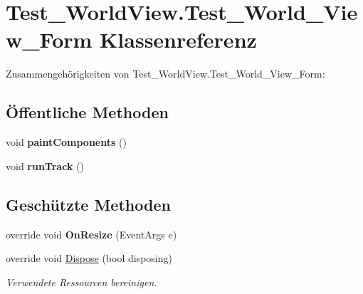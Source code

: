 \hypertarget{class_test___world_view_1_1_test___world___view___form}{
\section{Test\_\-WorldView.Test\_\-World\_\-View\_\-Form Klassenreferenz}
\label{class_test___world_view_1_1_test___world___view___form}
}


Zusammengehörigkeiten von Test\_\-WorldView.Test\_\-World\_\-View\_\-Form:\subsection*{Öffentliche Methoden}
\begin{DoxyCompactItemize}
\item 
\hypertarget{class_test___world_view_1_1_test___world___view___form_a8219259ff399a2c4df82670aa28d74eb}{
void {\bfseries paintComponents} ()}
\label{class_test___world_view_1_1_test___world___view___form_a8219259ff399a2c4df82670aa28d74eb}

\item 
\hypertarget{class_test___world_view_1_1_test___world___view___form_ad60d74c9c1ba9fe17b000f26facc611d}{
void {\bfseries runTrack} ()}
\label{class_test___world_view_1_1_test___world___view___form_ad60d74c9c1ba9fe17b000f26facc611d}

\end{DoxyCompactItemize}
\subsection*{Geschützte Methoden}
\begin{DoxyCompactItemize}
\item 
\hypertarget{class_test___world_view_1_1_test___world___view___form_ad830eaa7ae6426728e0d67a92dcaeb25}{
override void {\bfseries OnResize} (EventArgs e)}
\label{class_test___world_view_1_1_test___world___view___form_ad830eaa7ae6426728e0d67a92dcaeb25}

\item 
override void \hyperlink{class_test___world_view_1_1_test___world___view___form_a58c32471c42109624080524e42837cf0}{Dispose} (bool disposing)
\begin{DoxyCompactList}\small\item\em Verwendete Ressourcen bereinigen. \item\end{DoxyCompactList}\end{DoxyCompactItemize}


